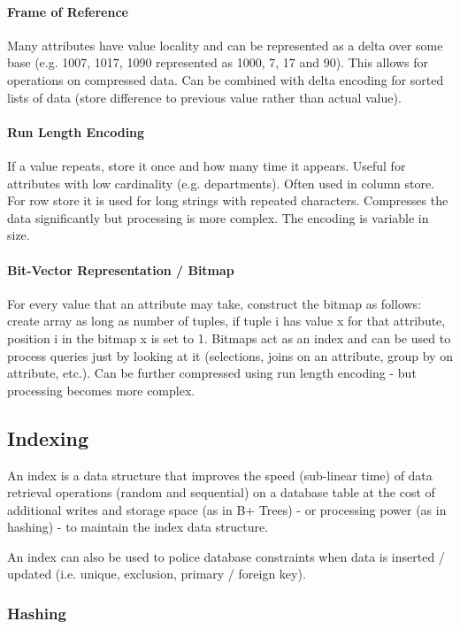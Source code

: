 \paragraph{Frame of Reference}
Many attributes have value locality and can be represented as a delta over some base (e.g. 1007, 1017, 1090 represented as 1000, 7, 17 and 90). This allows for operations on compressed data. Can be combined with delta encoding for sorted lists of data (store difference to previous value rather than actual value).

\paragraph{Run Length Encoding}
If a value repeats, store it once and how many time it appears. Useful for attributes with low cardinality (e.g. departments). Often used in column store. For row store it is used for long strings with repeated characters. Compresses the data significantly but processing is more complex. The encoding is variable in size.

\paragraph{Bit-Vector Representation / Bitmap}
For every value that an attribute may take, construct the bitmap as follows: create array as long as number of tuples, if tuple i has value x for that attribute, position i in the bitmap x is set to 1. Bitmaps act as an index and can be used to process queries just by looking at it (selections, joins on an attribute, group by on attribute, etc.). Can be further compressed using run length encoding - but processing becomes more complex.


\subsection{Indexing}

An index is a data structure that improves the speed (sub-linear time) of data retrieval operations (random and sequential) on a database table at the cost of additional writes and storage space (as in B+ Trees) - or processing power (as in hashing) - to maintain the index data structure.

An index can also be used to police database constraints when data is inserted / updated (i.e. unique, exclusion, primary / foreign key).


\subsubsection{Hashing}

